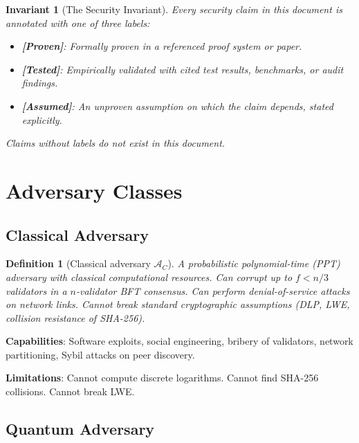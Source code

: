 \documentclass[11pt,a4paper]{article}
\newtheorem{definition}{Definition}[section]
\newtheorem{invariant}{Invariant}[section]
\begin{document}
\begin{invariant}[The Security Invariant]
\label{inv:main}
Every security claim in this document is annotated with one of three labels:
\begin{itemize}[leftmargin=2em]
  \item \textbf{[Proven]}: Formally proven in a referenced proof system or paper.
  \item \textbf{[Tested]}: Empirically validated with cited test results, benchmarks,
        or audit findings.
  \item \textbf{[Assumed]}: An unproven assumption on which the claim depends,
        stated explicitly.
\end{itemize}
Claims without labels do not exist in this document.
\end{invariant}

\section{Adversary Classes}
\label{sec:adversaries}

\subsection{Classical Adversary}

\begin{definition}[Classical adversary $\mathcal{A}_C$]
A probabilistic polynomial-time (PPT) adversary with classical computational resources.
Can corrupt up to $f < n/3$ validators in a $n$-validator BFT consensus. Can perform
denial-of-service attacks on network links. Cannot break standard cryptographic
assumptions (DLP, LWE, collision resistance of SHA-256).
\end{definition}

\textbf{Capabilities}: Software exploits, social engineering, bribery of validators,
network partitioning, Sybil attacks on peer discovery.

\textbf{Limitations}: Cannot compute discrete logarithms. Cannot find SHA-256
collisions. Cannot break LWE.

\subsection{Quantum Adversary}
\end{document}
